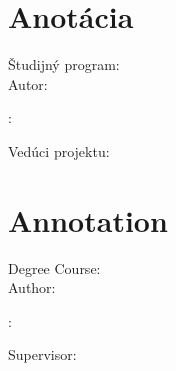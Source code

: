 \thispagestyle{empty}

\vspace*{\fill}

\section*{Anotácia}

\begin{minipage}[t]{1\columnwidth}
\FIITuniversitySK

\FIITfacultySK

Študijný program: \FIITstudyProgramSK\\

Autor: \FIITauthor

\FIITthesisSK: \FIITtitleSK

Vedúci projektu: \FIITsupervisor

\FIITdateSK
\end{minipage}

\bigskip{}

\lipsum[2]

\newpage{}\thispagestyle{empty}\medskip{}

\emptypage

\thispagestyle{empty}

\vspace*{\fill}

\section*{Annotation}

\begin{minipage}[t]{1\columnwidth}
\FIITuniversity

\FIITfaculty

Degree Course: \FIITstudyProgram\\

Author: \FIITauthor

\FIITthesis: \FIITtitle

Supervisor: \FIITsupervisor

\FIITdate
\end{minipage}

\bigskip{}

\lipsum[1]

\newpage{}\thispagestyle{empty}

\emptypage